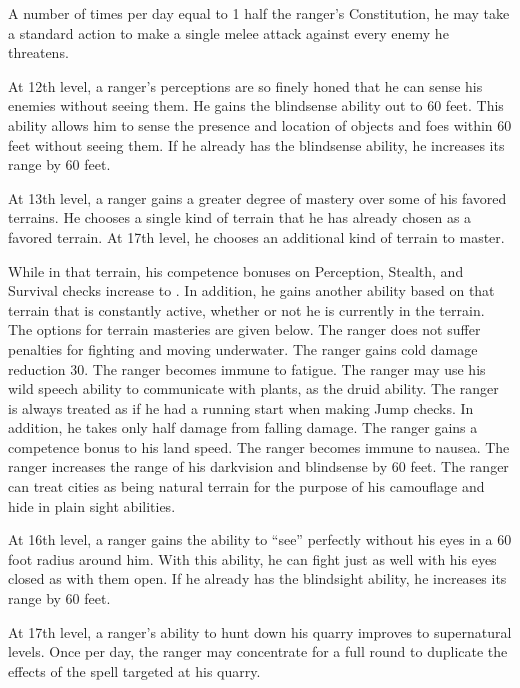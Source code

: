  A number of times per day equal to 1 \add half the ranger's Constitution, he may take a standard action to make a single melee attack against every enemy he threatens.

 At 12th level, a ranger's perceptions are so finely honed that he can sense his enemies without seeing them. He gains the blindsense ability out to 60 feet. This ability allows him to sense the presence and location of objects and foes within 60 feet without seeing them. If he already has the blindsense ability, he increases its range by 60 feet.

 At 13th level, a ranger gains a greater degree of mastery over some of his favored terrains. He chooses a single kind of terrain that he has already chosen as a favored terrain. At 17th level, he chooses an additional kind of terrain to master.
\par While in that terrain, his competence bonuses on Perception, Stealth, and Survival checks increase to . In addition, he gains another ability based on that terrain that is constantly active, whether or not he is currently in the terrain. The options for terrain masteries are given below.
 The ranger does not suffer penalties for fighting and moving underwater.
 The ranger gains cold damage reduction 30.
 The ranger becomes immune to fatigue.
 The ranger may use his wild speech ability to communicate with plants, as the druid ability.
 The ranger is always treated as if he had a running start when making Jump checks. In addition, he takes only half damage from falling damage.
 The ranger gains a  competence bonus to his land speed.
 The ranger becomes immune to nausea.
 The ranger increases the range of his darkvision and blindsense by 60 feet.
 The ranger can treat cities as being natural terrain for the purpose of his camouflage and hide in plain sight abilities.

 At 16th level, a ranger gains the ability to ``see'' perfectly without his eyes in a 60 foot radius around him. With this ability, he can fight just as well with his eyes closed as with them open. If he already has the blindsight ability, he increases its range by 60 feet.

 At 17th level, a ranger's ability to hunt down his quarry improves to supernatural levels. Once per day, the ranger may concentrate for a full round to duplicate the effects of the  spell targeted at his quarry.

